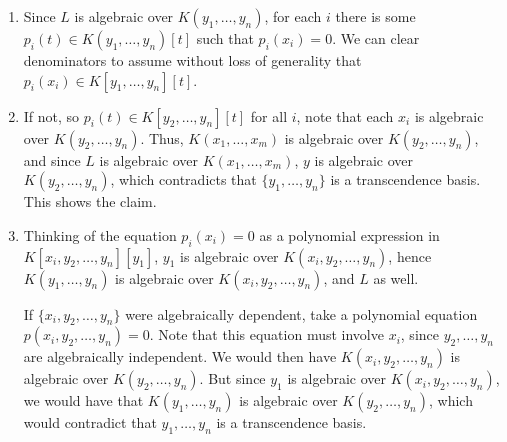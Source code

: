 \documentclass[12pt]{amsart}
\renewcommand{\1}{\mathbbm{1}}
\newcommand\itemb{\stepcounter{enumii}\item[(\theenumii)]}
\begin{document}
\begin{enumerate}
{\begin{enumerate}
\itemb  Since $L$ is algebraic over $K(y_1,\dots,y_n)$, for each $i$ there is some $p_i(t)\in K(y_1,\dots,y_n)[t]$ such that $p_i(x_i)=0$. We can clear denominators to assume without loss of generality that $p_i(x_i)\in K[y_1,\dots,y_n][t]$. 
\itemb If not, so $p_i(t) \in K[y_2,\dots,y_n][t]$ for all $i$, note that each $x_i$ is algebraic over $K(y_2,\dots,y_n)$.  Thus, $K(x_1,\dots,x_m)$ is algebraic over $K(y_2,\dots,y_n)$, and since $L$ is algebraic over $K(x_1,\dots,x_m)$, $y$ is algebraic over $K(y_2,\dots,y_n)$, which contradicts that $\{y_1,\dots,y_n\}$ is a transcendence basis. This shows the claim.
\itemb Thinking of the equation $p_i(x_i)=0$ as a polynomial expression in $K[x_i,y_2,\dots,y_n][y_1]$, $y_1$ is algebraic over $K(x_i,y_2,\dots,y_n)$, hence $K(y_1,\dots,y_n)$ is algebraic over $K(x_i,y_2,\dots,y_n)$, and $L$ as well.

If $\{x_i,y_2,\dots,y_n\}$ were algebraically dependent, take a polynomial equation $p(x_i,y_2,\dots,y_n)=0$. Note that this equation must involve $x_i$, since $y_2,\dots,y_n$ are algebraically independent. We would then have $K(x_i,y_2,\dots,y_n)$ is algebraic over $K(y_2,\dots,y_n)$. But since  $y_1$ is algebraic over $K(x_i,y_2,\dots,y_n)$, we would have that $K(y_1,\dots,y_n)$ is algebraic over $K(y_2,\dots,y_n)$, which would contradict that $y_1,\dots,y_n$ is a transcendence basis.
\end{enumerate}

}



\end{enumerate}
\end{document}
